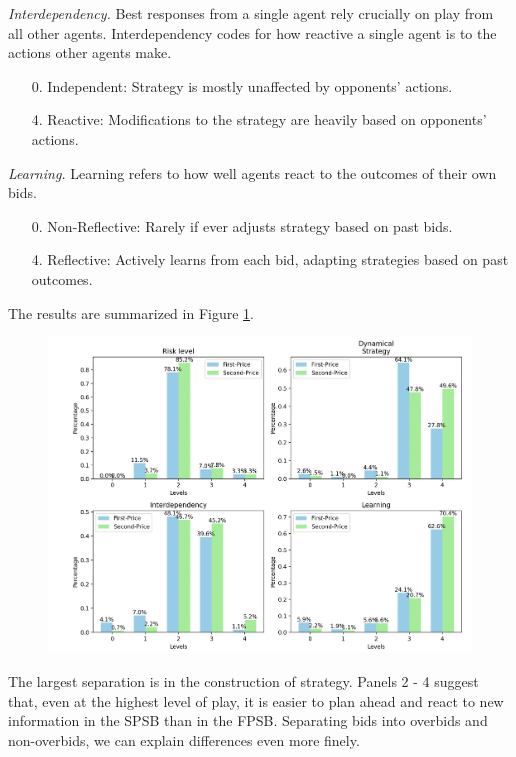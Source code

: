 \documentclass{article} %
\begin{document}
\textit{Interdependency.}
Best responses from a single agent rely crucially on play from all other agents. 
Interdependency codes for how reactive a single agent is to the actions other agents make.

\begin{enumerate}
    \item[0.] Independent: Strategy is mostly unaffected by opponents' actions. 
    \item[4.] Reactive: Modifications to the strategy are heavily based on opponents' actions. 
\end{enumerate}

\textit{Learning.}
Learning refers to how well agents react to the outcomes of their own bids.

\begin{enumerate}
    \item[0.] Non-Reflective: Rarely if ever adjusts strategy based on past bids.
    \item[4.] Reflective: Actively learns from each bid, adapting strategies based on past outcomes.
\end{enumerate}


The results are summarized in Figure \ref{fig:SemanticSummary}.   

\begin{figure}[h]
    \centering \includegraphics[width=0.8\linewidth]{Figs/FP_SB_semantic.png}
    \caption{ }
    \label{fig:SemanticSummary}
\end{figure}

The largest separation is in the construction of strategy. 
Panels 2 - 4 suggest that, even at the highest level of play, it is easier to plan ahead and react to new information in the SPSB than in the FPSB. 
Separating bids into overbids and non-overbids, we can explain differences even more finely.
\end{document}
